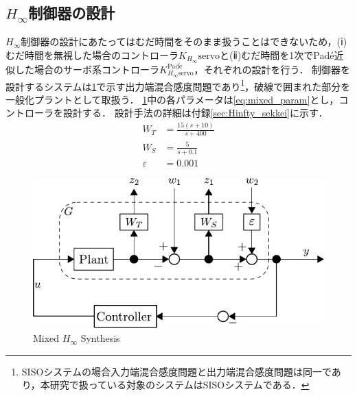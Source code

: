 \clearpage
\subsection{$H_\infty$制御器の設計}
\label{sec:H無限大制御器の設計}
$H_\infty$制御器の設計にあたってはむだ時間をそのまま扱うことはできないため，(ⅰ)むだ時間を無視した場合のコントローラ$K_{H_\infty}\mathrm{servo}$と(ⅱ)むだ時間を1次でPad\'e近似した場合のサーボ系コントローラ$K_{H_\infty\mathrm{servo}}^{\mathrm{Pad\acute{e}}}$，それぞれの設計を行う．
制御器を設計するシステムは\figname\ref{fig4:konngoukanndo}で示す出力端混合感度問題であり\footnote{SISOシステムの場合入力端混合感度問題と出力端混合感度問題は同一であり，本研究で扱っている対象のシステムはSISOシステムである．}，破線で囲まれた部分を一般化プラントとして取扱う．
\figname\ref{fig4:konngoukanndo}中の各パラメータは\eqnname\eqref{eq:mixed_param}とし，コントローラを設計する．
設計手法の詳細は付録\ref{sec:Hinfty_sekkei}に示す．
\begin{align}
    \label{eq:mixed_param}
		W_T &= \frac{15(s+10)}{s+400}\\
		W_S &= \frac{5}{s+0.1}\\
		\varepsilon &= 0.001
\end{align}
\begin{figure}[t]
    \centering
        \includegraphics[keepaspectratio, scale=1.0]{contents/ForceControl/figure/konngoukanndo.pdf}
        \caption{Mixed $H_\infty$ Synthesis}
        \label{fig4:konngoukanndo}
\end{figure}

